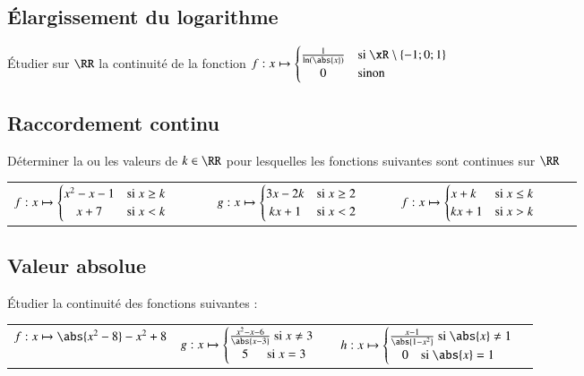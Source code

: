 \documentclass[oneside,12pt]{article}          %
\begin{document}
\subsection{Élargissement du logarithme}
Étudier sur $\RR$ la continuité de la fonction $f:x\mapsto\begin{cases}\frac{1}{\ln(\abs{x})}&  \text{si } \xR\setminus\{-1;0;1\} \\ \hfil 0  &\text{sinon}\end{cases}$



\subsection{Raccordement continu}
Déterminer la ou les valeurs de $k\in\RR$ pour lesquelles les fonctions suivantes sont continues sur $\RR$\\

\begin{tabular}{p{0.3\linewidth}p{0.27\linewidth}p{0.27\linewidth}}
	$f:x\mapsto \begin{cases}
					x^2-x-1 & \text{si } x\geq k \\
					\hfil x+7 & \text{si } x<k
					\end{cases}$
	&
	$g:x\mapsto \begin{cases}
					3x-2k & \text{si } x\geq 2 \\
					\hfil kx+1 & \text{si } x<2
					\end{cases}$
	&
	$f:x\mapsto \begin{cases}
					x+k & \text{si } x\leq k \\
					\hfil kx+1 & \text{si } x>k
					\end{cases}$
\end{tabular}



\subsection{Valeur absolue}
Étudier la continuité des fonctions suivantes :

\begin{tabular}{p{} p{} p{}}
    $f:x\mapsto\abs{x^2-8}-x^2+8$ & 
    $g:x\mapsto \begin{cases}\frac{x^2-x-6}{\abs{x-3}} \text{ si } x\neq3\\~~~~5 \text{ ~~~~~si }x =3\end{cases}$ &
    $h:x\mapsto \begin{cases}\frac{x-1}{\abs{1-x^2}} \text{ si } \abs{x}\neq1\\~~~~ 0 \text{~~~~si } \abs{x}=1\end{cases}$
\end{tabular}
\end{document}
